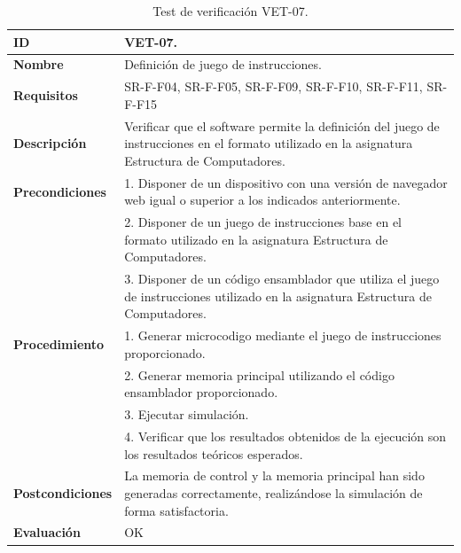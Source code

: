 \begin{center}
\begin{table}[htb]
\centering
\caption{Test de verificación VET-07.}
\begin{tabular}{@{}p{2.5cm} p{13cm}@{}} 
\toprule
\textbf{ID} 					& VET-07. \\
\midrule
\textbf{Nombre} 				& Definición de juego de instrucciones. \\
\midrule
\textbf{Requisitos} 		& SR-F-F04, SR-F-F05, SR-F-F09, SR-F-F10, SR-F-F11, SR-F-F15\\
\midrule
\textbf{Descripción} 		& Verificar que el \gls{software} permite la definición del juego de instrucciones en el formato utilizado en la asignatura Estructura de Computadores. \\
\midrule
\textbf{Precondiciones}		& 1. Disponer de un dispositivo con una versión de navegador web igual o superior a los indicados anteriormente. \\
											& 2. Disponer de un juego de instrucciones base en el formato utilizado en la asignatura Estructura de Computadores. \\
											& 3. Disponer de un código \gls{ensamblador} que utiliza el juego de instrucciones utilizado en la asignatura Estructura de Computadores. \\
\midrule
\textbf{Procedimiento}		& 1. Generar \gls{microcodigo} mediante el juego de instrucciones proporcionado.\\
											& 2. Generar memoria principal utilizando el código \gls{ensamblador} proporcionado.\\
											& 3. Ejecutar simulación.\\
											& 4. Verificar que los resultados obtenidos de la ejecución son los resultados teóricos esperados.\\
\midrule
\textbf{Postcondiciones} 		&  La memoria de control y la memoria principal han sido generadas correctamente, realizándose la simulación de forma satisfactoria.\\
\midrule
\textbf{Evaluación} 			& OK \\
\bottomrule
\end{tabular}
\label{tab:vet07}
\end{table}
\end{center}

